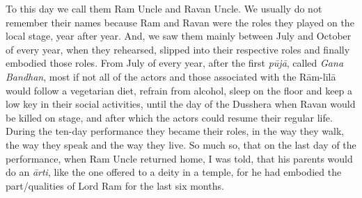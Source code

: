 To this day we call them Ram Uncle and Ravan Uncle. We usually do not remember their names because Ram and Ravan were the roles they played on the local stage, year after year. And, we saw them mainly between July and October of every year, when they rehearsed, slipped into their respective roles and finally embodied those roles. From July of every year, after the first \textit{pūjā}, called \textit{Gana Bandhan}, most if not all of the actors and those associated with the Rām-līlā would follow a vegetarian diet, refrain from alcohol, sleep on the floor and keep a low key in their social activities, until the day of the Dusshera when Ravan would be killed on stage, and after which the actors could resume their regular life. During the ten-day performance they became their roles, in the way they walk, the way they speak and the way they live. So much so, that on the last day of the performance, when Ram Uncle returned home, I was told, that his parents would do an \textit{ārti}, like the one offered to a deity in a temple, for he had embodied the part/qualities of Lord Ram for the last six months.

